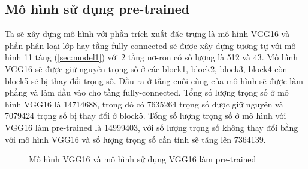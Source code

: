 \subsection{Mô hình sử dụng pre-trained}
Ta sẽ xây dựng mô hình với phần trích xuất đặc trưng là mô hình VGG16 và phần phân loại lớp hay tầng fully-connected sẽ được xây dựng tương tự với mô hình 11 tầng (\ref{sec:model1}) với 2 tầng nơ-ron có số lượng là 512 và 43. Mô hình VGG16 sẽ được giữ nguyên trọng số ở các block1, block2, block3, block4 còn block5 sẽ bị thay đổi trọng số. Đầu ra ở tầng cuối cùng của mô hình sẽ được làm phẳng và làm đầu vào cho tầng fully-connected. Tổng số lượng trọng số ở mô hình VGG16 là 14714688, trong đó có 7635264 trọng số được giữ nguyên và 7079424 trọng số bị thay đổi ở block5. Tổng số lượng trọng số ở mô hình với VGG16 làm pre-trained là 14999403, với số lượng trọng số không thay đổi bằng với mô hình VGG16 và số lượng trọng số cần tính sẽ tăng lên 7364139.
\begin{figure}[H]
\hspace{0.3cm}
\caption{Mô hình VGG16 và mô hình sử dụng VGG16 làm pre-trained}
\end{figure}
